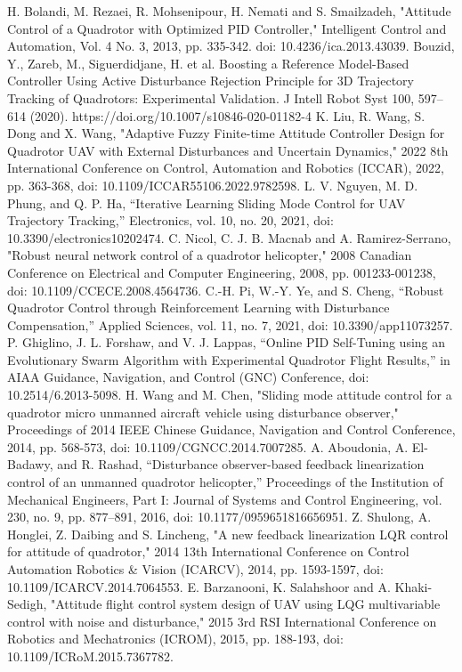 \documentclass[conference]{IEEEtran}
\begin{document}

\begin{thebibliography}{00}
 H. Bolandi, M. Rezaei, R. Mohsenipour, H. Nemati and S. Smailzadeh, "Attitude Control of a Quadrotor with Optimized PID Controller," Intelligent Control and Automation, Vol. 4 No. 3, 2013, pp. 335-342. doi: 10.4236/ica.2013.43039.
 Bouzid, Y., Zareb, M., Siguerdidjane, H. et al. Boosting a Reference Model-Based Controller Using Active Disturbance Rejection Principle for 3D Trajectory Tracking of Quadrotors: Experimental Validation. J Intell Robot Syst 100, 597–614 (2020). https://doi.org/10.1007/s10846-020-01182-4
 K. Liu, R. Wang, S. Dong and X. Wang, "Adaptive Fuzzy Finite-time Attitude Controller Design for Quadrotor UAV with External Disturbances and Uncertain Dynamics," 2022 8th International Conference on Control, Automation and Robotics (ICCAR), 2022, pp. 363-368, doi: 10.1109/ICCAR55106.2022.9782598.
 L. V. Nguyen, M. D. Phung, and Q. P. Ha, “Iterative Learning Sliding Mode Control for UAV Trajectory Tracking,” Electronics, vol. 10, no. 20, 2021, doi: 10.3390/electronics10202474.
 C. Nicol, C. J. B. Macnab and A. Ramirez-Serrano, "Robust neural network control of a quadrotor helicopter," 2008 Canadian Conference on Electrical and Computer Engineering, 2008, pp. 001233-001238, doi: 10.1109/CCECE.2008.4564736.
 C.-H. Pi, W.-Y. Ye, and S. Cheng, “Robust Quadrotor Control through Reinforcement Learning with Disturbance Compensation,” Applied Sciences, vol. 11, no. 7, 2021, doi: 10.3390/app11073257.
 P. Ghiglino, J. L. Forshaw, and V. J. Lappas, “Online PID Self-Tuning using an Evolutionary Swarm Algorithm with Experimental Quadrotor Flight Results,” in AIAA Guidance, Navigation, and Control (GNC) Conference, doi: 10.2514/6.2013-5098.
 H. Wang and M. Chen, "Sliding mode attitude control for a quadrotor micro unmanned aircraft vehicle using disturbance observer," Proceedings of 2014 IEEE Chinese Guidance, Navigation and Control Conference, 2014, pp. 568-573, doi: 10.1109/CGNCC.2014.7007285.
 A. Aboudonia, A. El-Badawy, and R. Rashad, “Disturbance observer-based feedback linearization control of an unmanned quadrotor helicopter,” Proceedings of the Institution of Mechanical Engineers, Part I: Journal of Systems and Control Engineering, vol. 230, no. 9, pp. 877–891, 2016, doi: 10.1177/0959651816656951.
 Z. Shulong, A. Honglei, Z. Daibing and S. Lincheng, "A new feedback linearization LQR control for attitude of quadrotor," 2014 13th International Conference on Control Automation Robotics \& Vision (ICARCV), 2014, pp. 1593-1597, doi: 10.1109/ICARCV.2014.7064553.
 E. Barzanooni, K. Salahshoor and A. Khaki-Sedigh, "Attitude flight control system design of UAV using LQG multivariable control with noise and disturbance," 2015 3rd RSI International Conference on Robotics and Mechatronics (ICROM), 2015, pp. 188-193, doi: 10.1109/ICRoM.2015.7367782.




\end{thebibliography}
\end{document}
